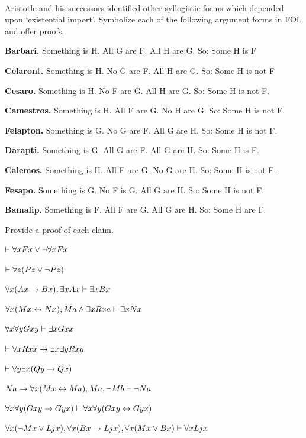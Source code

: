 \begin{practiceproblems}
\

\problempart
\label{pr:BarbaraEtc:proof2}
Aristotle and his successors identified other syllogistic forms which depended upon `existential import'. Symbolize each of the following argument forms in FOL and offer proofs.
\begin{ebullet}
	\item \textbf{Barbari.} Something is H. All G are F. All H are G. So: Some H is F
	\item \textbf{Celaront.} Something is H. No G are F. All H are G. So: Some H is not F
	\item \textbf{Cesaro.} Something is H. No F are G. All H are G. So: Some H is not F.
	\item \textbf{Camestros.} Something is H. All F are G. No H are G. So: Some H is not F.
	\item \textbf{Felapton.} Something is G. No G are F. All G are H. So: Some H is not F.
	\item \textbf{Darapti.} Something is G. All G are F. All G are H. So: Some H is F.
	\item \textbf{Calemos.} Something is H. All F are G. No G are H. So: Some H is not F.
	\item \textbf{Fesapo.} Something is G. No F is G. All G are H. So: Some H is not F.
	\item \textbf{Bamalip.} Something is F. All F are G. All G are H. So: Some H are F.
\end{ebullet}

\problempart
\label{pr:someFOLproofs}
Provide a proof of each claim.
\begin{problemslist}
\item $\vdash \forall x Fx \vee \neg \forall x Fx$
\item $\vdash\forall z (Pz \vee \neg Pz)$
\item $\forall x(Ax\rightarrow Bx), \exists x Ax \vdash \exists x Bx$
\item $\forall x(Mx \leftrightarrow Nx), Ma\mathbin{\wedge}\exists x Rxa\vdash \exists x Nx$
\item $\forall x \forall y Gxy\vdash\exists x Gxx$
\item $\vdash\forall x Rxx\rightarrow \exists x \exists y Rxy$
\item $\vdash\forall y \exists x (Qy \rightarrow Qx)$
\item $Na \rightarrow \forall x(Mx \leftrightarrow Ma), Ma, \neg Mb\vdash \neg Na$
\item $\forall x \forall y (Gxy \rightarrow Gyx) \vdash \forall x\forall y (Gxy \leftrightarrow Gyx)$
\item $\forall x(\neg Mx \vee Ljx), \forall x(Bx\rightarrow Ljx), \forall x(Mx\vee Bx)\vdash \forall xLjx$
\end{problemslist}


\end{practiceproblems}
